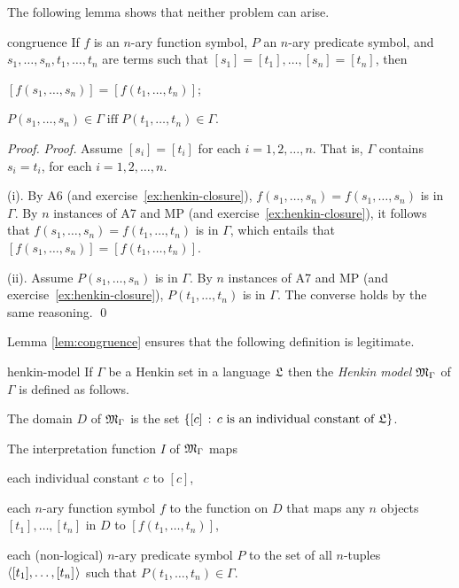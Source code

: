 The following lemma shows that neither problem can arise.

\begin{lemma}{}{congruence}
  If $f$ is an $n$-ary function symbol,
  $P$ an $n$-ary predicate symbol,
  and $s_{1}, \ldots, s_{n}, t_{1}, \ldots, t_{n}$ are terms such that
  $[s_{1}] = [t_{1}], \ldots, [s_{n}] = [t_{n}]$,
  then
  \begin{cenumerate}
    \item[(i)] $[f(s_1,\ldots,s_n)] = [f(t_{1},\ldots,t_{n})]$;
    \item[(ii)] $P(s_1,\ldots,s_n) \in \Gamma \; \text{iff} \; P(t_1,\ldots,t_n) \in \Gamma$.
  \end{cenumerate}
\end{lemma}

\begin{proof}
  \emph{Proof.}
  Assume $[s_{i}] = [t_{i}]$ for each $i=1,2,\ldots,n$.
  That is,
  $\Gamma$ contains $s_{i}\!=\!t_{i}$, for each $i=1,2,\ldots,n$.

  (i).
  By A6 (and exercise~\ref{ex:henkin-closure}),
  $f(s_{1},\ldots,s_{n})=f(s_{1},\ldots,s_{n})$ is in $\Gamma$.
  By $n$ instances of A7 and MP (and exercise~\ref{ex:henkin-closure}),
  it follows that $f(s_{1},\ldots,s_{n})=f(t_{1},\ldots,t_{n})$ is in $\Gamma$,
  which entails that $[f(s_1,\ldots,s_n)] = [f(t_{1},\ldots,t_{n})]$.

  (ii). Assume $P(s_{1},\ldots,s_{n})$ is in $\Gamma$.
  By $n$ instances of A7 and MP (and exercise~\ref{ex:henkin-closure}),
  $P(t_{1},\ldots,t_{n})$ is in $\Gamma$.
  The converse holds by the same reasoning.
  \qed
\end{proof}

Lemma \ref{lem:congruence} ensures that the following definition is legitimate.

\begin{definition}{}{henkin-model}
  If $\Gamma$ be a Henkin set in a language $\mathfrak{L}$
  then the \emph{Henkin model} $\mathfrak{M}_{\Gamma}$ of $\Gamma$ is defined as follows.

  \smallskip
  The domain $D$ of $\mathfrak{M}_{\Gamma}$ is the set $\{ [c] \,:\, c \text{ is an individual constant of } \mathfrak{L} \}$.

  \newpage

  The interpretation function $I$ of $\mathfrak{M}_{\Gamma}$ maps
  \begin{cenumerate}
    \item[(i)] each individual constant $c$ to $[c]$,
    \item[(ii)] each $n$-ary function symbol $f$ to the function on $D$ that maps
         any $n$ objects $[t_1],\ldots,[t_n]$ in $D$ to $[f(t_1,\ldots,t_n)]$,
    \item[(iii)] each (non-logical) $n$-ary predicate symbol $P$ to
         the set of all $n$-tuples $\t{[t_1],\ldots,[t_n]}$ such that $P(t_1,\ldots,t_n) \in \Gamma$.
  \end{cenumerate}
\end{definition}

